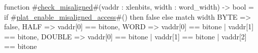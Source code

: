 function #\hyperref[sailRISCVzcheckzymisaligned]{check\_misaligned}#(vaddr : xlenbits, width : word_width) -> bool =
  if   #\hyperref[sailRISCVzplatzyenablezymisalignedzyaccess]{plat\_enable\_misaligned\_access}#() then false
  else match width {
         BYTE   => false,
         HALF   => vaddr[0] == bitone,
         WORD   => vaddr[0] == bitone | vaddr[1] == bitone,
         DOUBLE => vaddr[0] == bitone | vaddr[1] == bitone | vaddr[2] == bitone
       }
